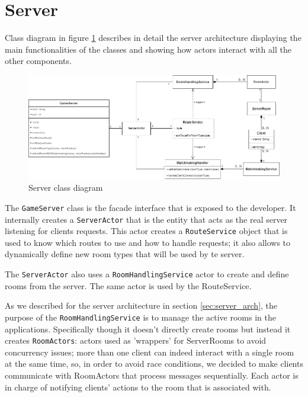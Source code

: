 \section{Server}
Class diagram in figure \ref{fig:server_class_diagram} describes in detail the server architecture displaying the main functionalities of the classes and showing how actors interact with all the other components. 
\begin{figure}[h]
	\hspace*{-1.1in}
	\includegraphics[scale=0.55]{images/4-design/server_class.png}
	\caption{Server class diagram}
	\label{fig:server_class_diagram}
\end{figure}

The \texttt{GameServer} class is the facade interface that is exposed to the developer. It internally creates a \texttt{ServerActor} that is the entity that acts as the real server listening for clients requests. This actor creates a \texttt{RouteService} object that is used to know which routes to use and how to handle requests; it also allows to dynamically define new room types that will be used by te server. 

The \texttt{ServerActor} also uses a \texttt{RoomHandlingService} actor to create and define rooms from the server. The same actor is used by the RouteService.

As we described for the server architecture in section \ref{sec:server_arch}, the purpose of the \texttt{RoomHandlingService} is to manage the active rooms in the applications. Specifically though it doesn't directly create rooms but instead it creates \texttt{RoomActors}: actors used as 'wrappers' for ServerRooms to avoid concurrency issues; more than one client can indeed interact with a single room at the same time, so, in order to avoid race conditions, we decided to make clients communicate with RoomActors that process messages sequentially. Each actor is in charge of notifying clients' actions to the room that is associated with.

